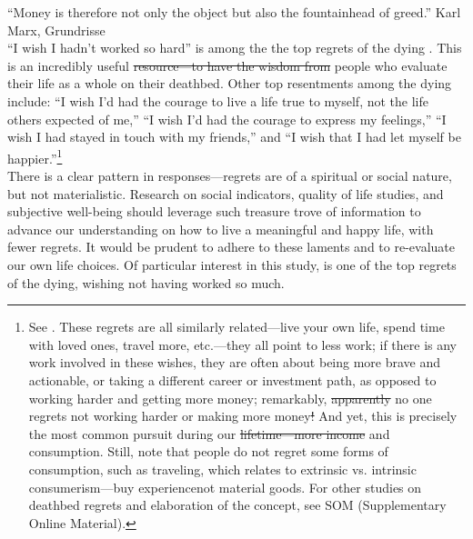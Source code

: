 \documentclass[10pt, letterpaper]{article}
\providecommand{\DIFaddtex}[1]{{\protect\color{blue}\uwave{#1}}} %
\providecommand{\DIFdeltex}[1]{{\protect\color{red}\sout{#1}}}                      %
\providecommand{\DIFaddbegin}{} %
\providecommand{\DIFaddend}{} %
\providecommand{\DIFdelbegin}{} %
\providecommand{\DIFdelend}{} %
\providecommand{\DIFadd}[1]{\texorpdfstring{\DIFaddtex{#1}}{#1}} %
\providecommand{\DIFdel}[1]{\texorpdfstring{\DIFdeltex{#1}}{}} %
\newcommand{\DIFscaledelfig}{0.5}
\newlength{\DIFdelgraphicswidth} %
\newlength{\DIFdelgraphicsheight} %
\newcommand{\DIFaddincludegraphics}[2][]{{\color{blue}\fbox{\DIFOincludegraphics[#1]{#2}}}} %
\newcommand{\DIFdelincludegraphics}[2][]{%
\sbox{\DIFdelgraphicsbox}{\DIFOincludegraphics[#1]{#2}}%
\settoboxwidth{\DIFdelgraphicswidth}{\DIFdelgraphicsbox} %
\settoboxtotalheight{\DIFdelgraphicsheight}{\DIFdelgraphicsbox} %
\scalebox{\DIFscaledelfig}{%
\parbox[b]{\DIFdelgraphicswidth}{\usebox{\DIFdelgraphicsbox}\\[-\baselineskip] \rule{\DIFdelgraphicswidth}{0em}}\llap{\resizebox{\DIFdelgraphicswidth}{\DIFdelgraphicsheight}{%
\setlength{\unitlength}{\DIFdelgraphicswidth}%
\begin{picture}(1,1)%
\thicklines\linethickness{2pt} %
{\color[rgb]{1,0,0}\put(0,0){\framebox(1,1){}}}%
{\color[rgb]{1,0,0}\put(0,0){\line( 1,1){1}}}%
{\color[rgb]{1,0,0}\put(0,1){\line(1,-1){1}}}%
\end{picture}%
}\hspace*{3pt}}} %
} %
\DeclareRobustCommand{\DIFaddbegin}{\DIFOaddbegin \let\includegraphics\DIFaddincludegraphics} %
\DeclareRobustCommand{\DIFaddend}{\DIFOaddend \let\includegraphics\DIFOincludegraphics} %
\DeclareRobustCommand{\DIFdelbegin}{\DIFOdelbegin \let\includegraphics\DIFdelincludegraphics} %
\DeclareRobustCommand{\DIFdelend}{\DIFOaddend \let\includegraphics\DIFOincludegraphics} %
\begin{document}
\begin{spacing}{1.8} %


\noindent``Money is therefore not only the object but also the fountainhead of greed.'' Karl Marx, Grundrisse\\



\noindent ``I wish I hadn't worked so hard'' is among the the top regrets of the dying \citep{ware12}.
 This is an incredibly useful \DIFdelbegin \DIFdel{resource---to have the wisdom from }\DIFdelend \DIFaddbegin \DIFadd{resource:  the wisdom of }\DIFaddend people who evaluate their life as a whole on their deathbed. Other top resentments among the dying include: ``I wish I'd had the courage to live a life true to myself, not the life others
expected of me,'' ``I wish I'd had the courage to express my feelings,'' ``I wish I had stayed in touch with my friends,'' and ``I wish that I had let myself be happier.''\footnote{See \citet{ware12}. These regrets are all similarly related---live your own life, spend time with loved ones, travel more, etc.---they all
  point to less work; if there is any work involved in these wishes, they are often about being
  more brave and actionable, or taking a different career or investment path, as opposed to
  working harder and getting more money; remarkably,  \DIFdelbegin \DIFdel{apparently }\DIFdelend no one regrets not working harder or making more money\DIFdelbegin \DIFdel{! }\DIFdelend \DIFaddbegin \DIFadd{. }\DIFaddend And yet, this is precisely the most common pursuit during our \DIFdelbegin \DIFdel{lifetime---more income }\DIFdelend \DIFaddbegin \DIFadd{lifetime---income }\DIFaddend and consumption. Still, note that people do not regret some forms of consumption, such as traveling, which relates to extrinsic vs. intrinsic consumerism---buy experience\DIFaddbegin \DIFadd{, }\DIFaddend not material goods. For other studies on deathbed regrets and elaboration of the concept, see SOM (Supplementary Online Material).}\\

There is a clear pattern
in responses---regrets are of a spiritual or social nature, but not materialistic. Research on social indicators, quality of life studies, and subjective well-being should leverage such treasure
trove of information
to advance our understanding on how to live a meaningful and happy life, with fewer regrets. 
It  would be prudent to adhere to these laments and to re-evaluate our own life choices. Of particular interest in this study, is one of the top regrets of the dying, wishing not having worked so much.  


\end{spacing}
\end{document}
